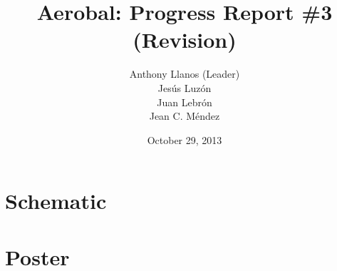 \documentclass[12pt,letterpaper]{report}
\title{	
Aerobal: Progress Report \#3 (Revision)
}
\date{October 29, 2013}
\author{Anthony Llanos (Leader)\\ Jes\'{u}s Luz\'{o}n \\ Juan Lebr\'{o}n \\ Jean C. M\'{e}ndez}
\begin{document}
	\maketitle
	\tableofcontents
	\newpage

	
	\part*{Schematic}
	
	
	
	
	
	\part*{Poster}
	
	
\end{document}
